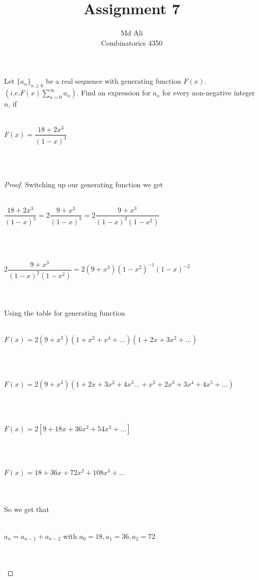 \documentclass[12pt]{article}
\newenvironment{problem}[2][Problem]{\begin{trivlist}
\item[\hskip \labelsep {\bfseries #1}\hskip \labelsep {\bfseries #2.}]}{\end{trivlist}}
\begin{document}
 
 
\title{Assignment 7}%
\author{Md Ali\\ %
Combinatorics 4350} %
 
\maketitle
 
\begin{problem}{1} %
Let $\{ a_n \}_{n \geq 0}$ be a real sequence with generating function $F(x)$. $(i.e. F(x) \sum_{n=0}^{\infty} a_n)$. Find an expression for $a_n$ for every non-negative integer $n$, if \\ \\ 
\centerline{$F(x) = \dfrac{18+2x^3}{(1-x)^3}$} \\ \\

\end{problem}

\begin{proof}
Switching up our generating function we get \\ \\
\centerline{ $\dfrac{18+2x^3}{(1-x)^3} =  2\dfrac{9+x^3}{(1-x)^3} =  2\dfrac{9+x^3}{(1-x)^2(1-x^2)}$} \\ \\
\centerline{ $2\dfrac{9+x^3}{(1-x)^2(1-x^2)} = 2(9+x^3)(1-x^2)^{-1}(1-x)^{-2}$} \\ \\
Using the table for generating function \\ \\
\centerline{$F(x) = 2(9+x^3)(1+x^2+x^4+...)(1+2x+3x^2+...)$} \\ \\
\centerline{$F(x) = 2(9+x^3)(1+2x+3x^2+4x^3...+x^2+2x^3+3x^4+4x^5+...)$} \\ \\
\centerline{$F(x) = 2[9+18x+36x^2 +54x^3+...]$} \\ \\
\centerline{$F(x) = 18+36x+72x^2+108x^3+...$} \\ \\
So we get that \\ \\
\centerline{$a_n = a_{n-1}+a_{n-2}$ with $a_0=18,a_1 = 36, a_2 = 72$} \\ \\

\end{proof}
\end{document}
